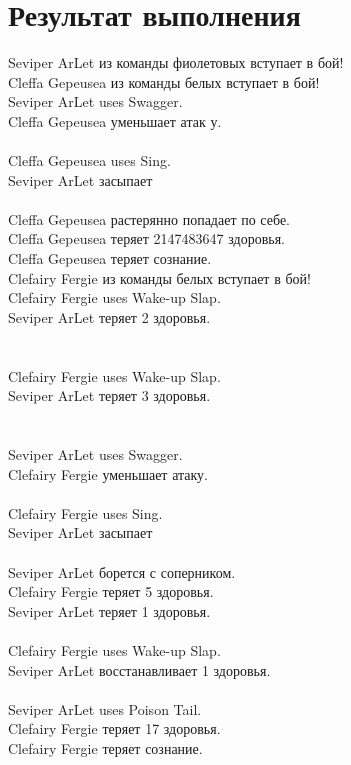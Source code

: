 \documentclass[12pt,onecolumn]{article}
\begin{document}
\section{Результат выполнения}
Seviper ArLet из команды фиолетовых вступает в бой! \\
Cleffa Gepeusea из команды белых вступает в бой! \\
Seviper ArLet uses Swagger. \\
Cleffa Gepeusea уменьшает атак у. \\
\\
Cleffa Gepeusea uses Sing. \\
Seviper ArLet засыпает\\
\\
Cleffa Gepeusea растерянно попадает по себе.\\
Cleffa Gepeusea теряет 2147483647 здоровья.\\
Cleffa Gepeusea теряет сознание.\\
Clefairy Fergie из команды белых вступает в бой!\\
Clefairy Fergie uses Wake-up Slap.\\
Seviper ArLet теряет 2 здоровья.\\
\\
\\
Clefairy Fergie uses Wake-up Slap.\\
Seviper ArLet теряет 3 здоровья.\\
\\
\\
Seviper ArLet uses Swagger.\\
Clefairy Fergie уменьшает атаку.\\
\\
Clefairy Fergie uses Sing.\\
Seviper ArLet засыпает\\
\\
Seviper ArLet борется с соперником.\\
Clefairy Fergie теряет 5 здоровья.\\
Seviper ArLet теряет 1 здоровья.\\
\\
Clefairy Fergie uses Wake-up Slap.\\
Seviper ArLet восстанавливает 1 здоровья.\\
\\
Seviper ArLet uses Poison Tail.\\
Clefairy Fergie теряет 17 здоровья.\\
Clefairy Fergie теряет сознание.\\
\end{document}
